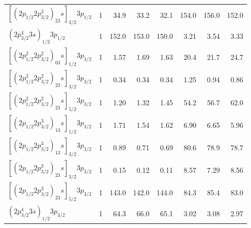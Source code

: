 \documentclass[preprint, floatfix, pra, showpacs, showkeys]{revtex4}
\begin{document}
\begin{table}
\begin{ruledtabular}
\begin{tabular}{l*{7}{d}}
$[(2p_{1/2}2p^3_{3/2})_23s]_{3/2}3p_{1/2}$&1&34.9&33.2&32.1&154.0&156.0&152.0\\
$(2p^4_{3/2}3s)_{1/2}3p_{1/2}$&1&152.0&153.0&150.0&3.21&3.54&3.33\\
$[(2p^2_{1/2}2p^2_{3/2})_03s]_{1/2}3p_{3/2}$&1&1.57&1.69&1.63&20.4&21.7&24.7\\
$[(2p^2_{1/2}2p^2_{3/2})_23s]_{3/2}3p_{3/2}$&1&0.34&0.34&0.34&1.25&0.94&0.86\\
$[(2p^2_{1/2}2p^2_{3/2})_23s]_{5/2}3p_{3/2}$&1&1.20&1.32&1.45&54.2&56.7&62.0\\
$[(2p_{1/2}2p^3_{3/2})_13s]_{1/2}3p_{3/2}$&1&1.71&1.54&1.62&6.90&6.65&5.96\\
$[(2p_{1/2}2p^3_{3/2})_13s]_{3/2}3p_{3/2}$&1&0.89&0.71&0.69&80.6&78.9&78.7\\
$[(2p_{1/2}2p^3_{3/2})_23s]_{3/2}3p_{3/2}$&1&0.15&0.12&0.11&8.57&7.29&8.56\\
$[(2p_{1/2}2p^3_{3/2})_23s]_{5/2}3p_{3/2}$&1&143.0&142.0&144.0&84.3&85.4&83.0\\
$(2p^4_{3/2}3s)_{1/2}3p_{3/2}$&1&64.3&66.0&65.1&3.02&3.08&2.97\\
\end{tabular}
\end{ruledtabular}
\end{table}
\endgroup
\end{document}
